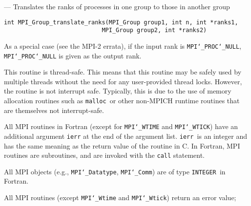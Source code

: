 \startmanpage
{}
--- Translates the ranks of processes in one group to  those in another group 
\startvb\begin{verbatim}
int MPI_Group_translate_ranks(MPI_Group group1, int n, int *ranks1, 
                            MPI_Group group2, int *ranks2)

\end{verbatim}
\endvb

\par
{}
\par
As a special case (see the MPI-2 errata), if the input rank is
{\tt MPI{\tt \char`\_}PROC{\tt \char`\_}NULL}, {\tt MPI{\tt \char`\_}PROC{\tt \char`\_}NULL} is given as the output rank.
\par
{}
\par
This routine is thread-safe.  This means that this routine may be
safely used by multiple threads without the need for any user-provided
thread locks.  However, the routine is not interrupt safe.  Typically,
this is due to the use of memory allocation routines such as {\tt malloc
}or other non-MPICH runtime routines that are themselves not interrupt-safe.
\par
{}
All MPI routines in Fortran (except for {\tt MPI{\tt \char`\_}WTIME} and {\tt MPI{\tt \char`\_}WTICK}) have
an additional argument {\tt ierr} at the end of the argument list.  {\tt ierr
}is an integer and has the same meaning as the return value of the routine
in C.  In Fortran, MPI routines are subroutines, and are invoked with the
{\tt call} statement.
\par
All MPI objects (e.g., {\tt MPI{\tt \char`\_}Datatype}, {\tt MPI{\tt \char`\_}Comm}) are of type {\tt INTEGER
}in Fortran.
\par
{}
\par
All MPI routines (except {\tt MPI{\tt \char`\_}Wtime} and {\tt MPI{\tt \char`\_}Wtick}) return an error value;
